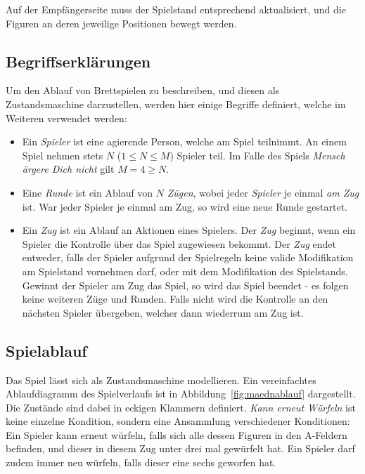 Auf der Empfängerseite muss der Spielstand entsprechend aktualisiert, und die Figuren an deren jeweilige Positionen bewegt werden.

\subsection{Begriffserklärungen}
Um den Ablauf von Brettspielen zu beschreiben, und diesen als Zustandsmaschine darzustellen, werden hier einige Begriffe definiert, welche im Weiteren verwendet werden:

\begin{itemize}
    \item Ein \textit{Spieler} ist eine agierende Person, welche am Spiel teilnimmt. An einem Spiel nehmen stets $N$ ($1 \leq N \leq M$) Spieler teil. Im Falle des Spiels \textit{Mensch ärgere Dich nicht} gilt $M = 4 \geq N$.
    
    \item Eine \textit{Runde} ist ein Ablauf von $N$ \textit{Zügen}, wobei jeder      \textit{Spieler} je einmal \textit{am Zug} ist. War jeder Spieler je einmal am Zug, so wird eine neue Runde gestartet.
    
    \item Ein \textit{Zug} ist ein Ablauf an Aktionen eines Spielers. Der \textit{Zug} beginnt, wenn ein Spieler die Kontrolle über das Spiel zugewiesen bekommt. Der \textit{Zug} endet entweder, falls der Spieler aufgrund der Spielregeln keine valide Modifikation am Spielstand vornehmen darf, oder mit dem Modifikation des Spielstands. Gewinnt der Spieler am Zug das Spiel, so wird das Spiel beendet - es folgen keine weiteren Züge und Runden. Falls nicht wird die Kontrolle an den nächsten Spieler übergeben, welcher dann wiederrum am Zug ist.
\end{itemize}

\subsection{Spielablauf}
Das Spiel lässt sich als Zustandsmaschine modellieren. Ein vereinfachtes Ablaufdiagramm des Spielverlaufs ist in Abbildung~\ref{fig:maednablauf} dargestellt. Die \glqq{}Zustände\grqq{} sind dabei in eckigen Klammern definiert. \textit{Kann erneut Würfeln} ist keine einzelne Kondition, sondern eine Ansammlung verschiedener Konditionen: Ein Spieler kann erneut würfeln, falls sich alle dessen Figuren in den A-Feldern befinden, und dieser in diesem Zug unter drei mal gewürfelt hat. Ein Spieler darf zudem immer neu würfeln, falls dieser eine sechs geworfen hat.

